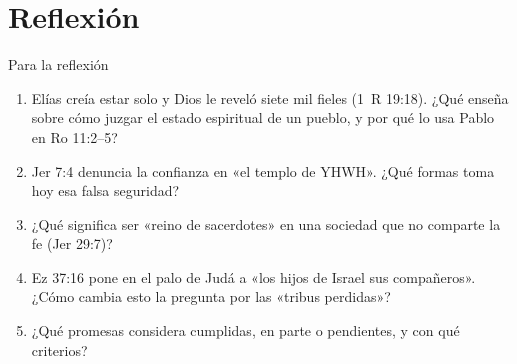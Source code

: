 \section{Reflexión}
\begin{frame}{Para la reflexión}
\small
\begin{enumerate}\setlength{\itemsep}{5pt}
\item Elías creía estar solo y Dios le reveló siete mil fieles (1~R 19:18). ¿Qué enseña sobre cómo juzgar el estado espiritual de un pueblo, y por qué lo usa Pablo en Ro 11:2--5?
\item Jer 7:4 denuncia la confianza en «el templo de YHWH». ¿Qué formas toma hoy esa falsa seguridad?
\item ¿Qué significa ser «reino de sacerdotes» en una sociedad que no comparte la fe (Jer 29:7)?
\item Ez 37:16 pone en el palo de Judá a «los hijos de Israel sus compañeros». ¿Cómo cambia esto la pregunta por las «tribus perdidas»?
\item ¿Qué promesas considera cumplidas, en parte o pendientes, y con qué criterios?
\end{enumerate}
\end{frame}

